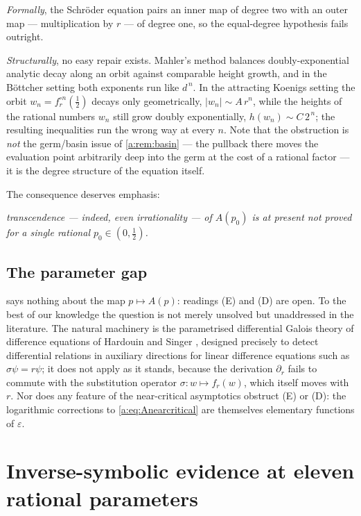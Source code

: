 \emph{Formally}, the Schröder equation pairs an inner map of degree two with an
outer map --- multiplication by $r$ --- of degree one, so the equal-degree
hypothesis fails outright.

\emph{Structurally}, no easy repair exists. Mahler's method balances
doubly-exponential analytic decay along an orbit against comparable height growth,
and in the Böttcher setting both exponents run like $d^{\,n}$. In the attracting
Koenigs setting the orbit $w_n = f_r^{\circ n}(\tfrac12)$ decays only geometrically,
$|w_n|\sim A\,r^{n}$, while the heights of the rational numbers $w_n$ still grow
doubly exponentially, $h(w_n)\sim C\,2^{\,n}$; the resulting inequalities run the
wrong way at every $n$. Note that the obstruction is \emph{not} the germ/basin
issue of \cref{a:rem:basin} --- the pullback there moves the evaluation point
arbitrarily deep into the germ at the cost of a rational factor --- it is the degree
structure of the equation itself.

The consequence deserves emphasis:
\begin{center}
\emph{transcendence --- indeed, even irrationality --- of $A(p_0)$ is at present
not proved\\ for a single rational $p_0\in(0,\tfrac12)$.}
\end{center}

\subsection*{The parameter gap}

 says nothing about the map $p\mapsto A(p)$: readings (E) and (D)
are open. To the best of our knowledge the question is not merely unsolved but
unaddressed in the literature. The natural machinery is the parametrised
differential Galois theory of difference equations of Hardouin and Singer
\cite{HardouinSinger2008}, designed precisely to detect differential relations in
auxiliary directions for linear difference equations such as $\sigma\psi = r\psi$;
it does not apply as it stands, because the derivation $\partial_r$ fails to commute
with the substitution operator $\sigma\colon w\mapsto f_r(w)$, which itself moves
with $r$. Nor does any feature of the near-critical asymptotics obstruct (E) or
(D): the logarithmic corrections to \cref{a:eq:Anearcritical} are themselves
elementary functions of $\varepsilon$.

\section{Inverse-symbolic evidence at eleven rational parameters}
\label{a:sec:pslq}

